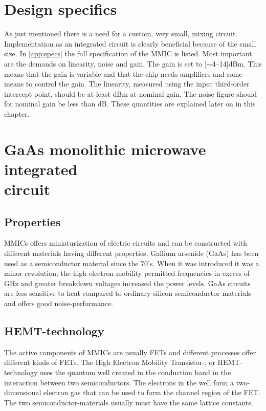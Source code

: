 	\section{Design specifics}
		As just mentioned there is a need for a custom, very small, mixing circuit. Implementation as an integrated circuit is clearly beneficial because of the small size. In \autoref{app:specs} the full specification of the MMIC is listed. Most important are the demands on linearity, noise and gain. The gain is set to \unit[$\sim$4--14]{dBm}. This means that the gain is variable and that the chip needs amplifiers and some means to control the gain. The linearity, measured using the input third-order intercept point, should be at least \unit[15]{dBm} at nominal gain. The noise figure should for nominal gain be less than \unit[15]{dB}. These quantities are explained later on in this chapter.
		

	\section{GaAs monolithic microwave integrated \\circuit}
		\subsection{Properties}
				
		MMICs offers miniaturization of electric circuits and can be constructed with different materials having different properties. Gallium arsenide (GaAs) has been used as a semiconductor material since the 70's. When it was introduced it was a minor revolution; the high electron mobility permitted frequencies in excess of \unit[200]{GHz} and greater breakdown voltages increased the power levels. GaAs circuits are less sensitive to heat compared to ordinary silicon semiconductor materials and offers good noise-performance.\autocite{robertson95} %

		\subsection{HEMT-technology}
			The active components of MMICs are usually FETs and different processes offer different kinds of FETs.	The High Electron Mobility Transistor-, or HEMT-technology uses the quantum well created in the conduction band in the interaction between two semiconductors. The electrons in the well form a two-dimensional electron gas that can be used to form the channel region of the FET.\autocite{mimura80} The two semiconductor-materials usually must have the same lattice constants.

